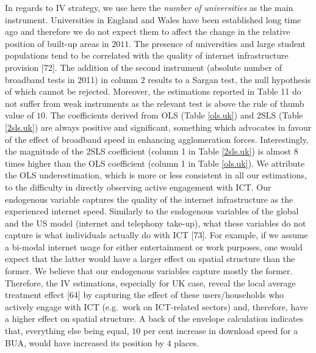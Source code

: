 \documentclass[10pt,letterpaper]{article}
\begin{document}
In regards to IV strategy, we use here the \emph{number of universities}
as the main instrument. Universities in England and Wales have been
established long time ago and therefore we do not expect them to affect
the change in the relative position of built-up areas in \(2011\). The
presence of universities and large student populations tend to be
correlated with the quality of internet infrastructure provision
{[}72{]}. The addition of the second instrument (absolute number of
broadband tests in 2011) in column \(2\) results to a Sargan test, the
null hypothesis of which cannot be rejected. Moreover, the estimations
reported in Table 11 do not suffer from weak instruments as the relevant
test is above the rule of thumb value of \(10\). The coefficients
derived from OLS (Table \ref{ols.uk}) and 2SLS (Table \ref{2sls.uk}) are
always positive and significant, something which advocates in favour of
the effect of broadband speed in enhancing agglomeration forces.
Interestingly, the magnitude of the 2SLS coefficient (column 1 in Table
\ref{2sls.uk}) is almost 8 times higher than the OLS coefficient (column
1 in Table \ref{ols.uk}). We attribute the OLS underestimation, which is
more or less consistent in all our estimations, to the difficulty in
directly observing active engagement with ICT. Our endogenous variable
captures the quality of the internet infrastructure as the experienced
internet speed. Similarly to the endogenous variables of the global and
the US model (internet and telephony take-up), what these variables do
not capture is what individuals actually do with ICT {[}73{]}. For
example, if we assume a bi-modal internet usage for either entertainment
or work purposes, one would expect that the latter would have a larger
effect on spatial structure than the former. We believe that our
endogenous variables capture mostly the former. Therefore, the IV
estimations, especially for UK case, reveal the local average treatment
effect {[}64{]} by capturing the effect of these users/households who
actively engage with ICT (e.g.~work on ICT-related sectors) and,
therefore, have a higher effect on spatial structure. A back of the
envelope calculation indicates that, everything else being equal, \(10\)
per cent increase in download speed for a BUA, would have increased its
position by \(4\) places.
\end{document}
